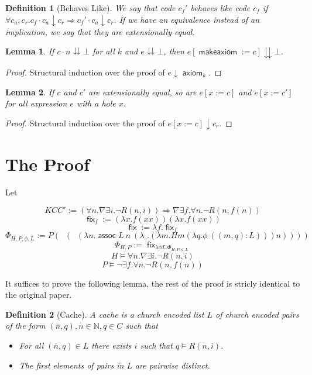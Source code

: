 \documentclass{article}
\newtheorem{definition}{Definition}
\newtheorem{lemma}{Lemma}
\DeclareMathOperator{\makeaxiom}{\mathsf{makeaxiom}}
\DeclareMathOperator{\axiom}{\mathsf{axiom}}
\DeclareMathOperator{\assoc}{\mathsf{assoc}}
\DeclareMathOperator{\fix}{\mathsf{fix}}
\DeclareMathOperator{\introexists}{\mathsf{intro}_\exists}
\DeclareMathOperator{\introforall}{\mathsf{intro}_\forall}
\newcommand{\N}{\mathbb{N}}
\begin{document}
\begin{definition}[Behaves Like]
    We say that code $c_f'$ behaves like code $c_f$ if $\forall c_a, c_r. c_f \cdot c_a \downarrow c_r \Rightarrow c_f' \cdot c_a \downarrow c_r$.
    If we have an equivalence instead of an implication, we say that they are extensionally equal.
\end{definition}

\begin{lemma}\label{substaxiomcongr}
    If $c \cdot \overline{n} \downdownarrows \bot$ for all $k$ and $e \downdownarrows \bot$, then $e[\makeaxiom := c] \downdownarrows \bot$.
\end{lemma}
\begin{proof}
    Structural induction over the proof of $e \downarrow \axiom_k$.
\end{proof}

\begin{lemma}\label{extcongr}
    If $c$ and $c'$ are extensionally equal, so are $e[x := c]$ and $e[x := c']$ for all expression $e$ with a hole $x$.
\end{lemma}
\begin{proof}
    Structural induction over the proof of $e[x := c] \downarrow c_r$.
\end{proof}

\section{The Proof}

Let

\[ KCC' := (\forall n. \nabla \exists i. \neg R(n, i)) \Rightarrow \nabla \exists f. \forall n. \neg R(n, f(n)) \]
\[ \fix_f := (\lambda x. f (x x)) (\lambda x. f (x x)) \]
\[ \fix := \lambda f. \fix_f \]
\[ \Phi_{H, P, \phi, L} := P (\introexists (\introforall (\lambda n. \assoc L\ n\ (\lambda \_. (\lambda m. H m (\lambda q. \phi\ ((m, q):L))) n)))) \]
\[ \Phi_{H, P} := \fix_{\lambda \phi L. \Phi_{H, P, \phi, L}} \]
\[H \models \forall n. \nabla \exists i. \neg R(n, i)\]
\[P \models \neg \exists f. \forall n. \neg R(n, f(n))\]

\emnote{what is $\assoc$?}

It suffices to prove the following lemma, the rest of the proof is stricly identical to the original paper.

\begin{definition}[Cache]
    A cache is a church encoded list $L$ of church encoded pairs of the form $(\overline{n}, q), n \in \N, q \in C$ such that
    \begin{itemize}
        \item For all $(\overline{n}, q) \in L$ there exists $i$ such that $q \models R(n, i)$. 
        \item The first elements of pairs in $L$ are pairwise distinct.
    \end{itemize}
\end{definition}
\end{document}
